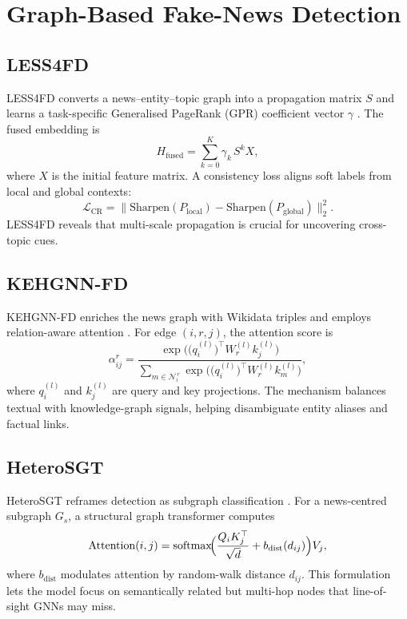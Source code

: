 \section{Graph-Based Fake-News Detection}\label{sec:graphfd}

\subsection{LESS4FD}\label{sec:graphfd:less4fd}
LESS4FD converts a news–entity–topic graph into a propagation matrix $S$
and learns a task-specific Generalised PageRank (GPR) coefficient vector $\gamma$ \cite{LESS4FD}.  
The fused embedding is
\begin{equation}
H_{\text{fused}}
    = \sum_{k=0}^{K} \gamma_k\,S^{k} X,
\label{eq:less4fdgpr}
\end{equation}
where $X$ is the initial feature matrix.  
A consistency loss aligns soft labels from local and global contexts:
\[
\mathcal L_{\text{CR}} 
   = \bigl\| \text{Sharpen}(P_{\text{local}}) 
          - \text{Sharpen}(P_{\text{global}}) \bigr\|_2^2 .
\]
LESS4FD reveals that multi-scale propagation is crucial for uncovering cross-topic cues.

\subsection{KEHGNN-FD}\label{sec:graphfd:kehgnn}
KEHGNN-FD enriches the news graph with Wikidata triples and employs relation-aware attention \cite{KEHGNN-FD}.  
For edge $(i,r,j)$, the attention score is
\begin{equation}
\alpha_{ij}^{r}
  = \frac{
      \exp\!\bigl(
        \bigl(q_i^{(l)}\bigr)^{\!\top}
        W_r^{(l)} k_j^{(l)}
      \bigr)}
      {\sum_{m\in\mathcal N_i^{\,r}}
       \exp\!\bigl(
         \bigl(q_i^{(l)}\bigr)^{\!\top}
         W_r^{(l)} k_m^{(l)}
       \bigr)},
\end{equation}
where $q_i^{(l)}$ and $k_j^{(l)}$ are query and key projections.  
The mechanism balances textual with knowledge-graph signals, helping disambiguate entity aliases and factual links.

\subsection{HeteroSGT}\label{sec:graphfd:heterosgt}
HeteroSGT reframes detection as subgraph classification \cite{heterosgt}.  
For a news-centred subgraph $G_s$, a structural graph transformer computes
\begin{equation}
\text{Attention}(i,j)
  = \text{softmax}\!
    \Bigl(
      \frac{
        Q_i K_j^{\top}}{\sqrt d} 
      + b_{\text{dist}}(d_{ij})
    \Bigr) V_j ,
\label{eq:heterosgt}
\end{equation}
where $b_{\text{dist}}$ modulates attention by random-walk distance $d_{ij}$.  
This formulation lets the model focus on semantically related but multi-hop nodes that line-of-sight GNNs may miss.

